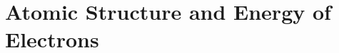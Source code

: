 \documentclass[../hchem.tex]{subfiles}
\begin{document}
\chapter{Atomic Structure and Energy of Electrons}
\end{document}
